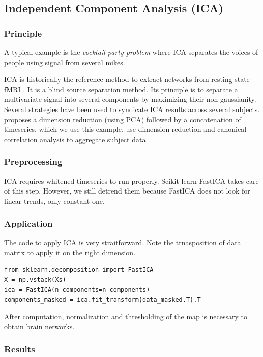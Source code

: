 \documentclass{frontiersSCNS} %
\begin{document}
\subsection{Independent Component Analysis (ICA)}

\subsubsection{Principle}

A typical example is the \emph{cocktail party problem} where ICA separates the
voices of people using signal from several mikes.

ICA is historically the reference method to extract networks from resting state
fMRI \cite{biswal1999}. It is a blind source separation method. Its principle is
to separate a
multivariate signal into several components by maximizing their non-gaussianity.
Several strategies have been used to syndicate ICA
results across several subjects. \cite{calhoun2001a} proposes a dimension
reduction (using PCA) followed by a concatenation of timeseries, which we use
this example.
\cite{varoquaux2010} use dimension reduction and canonical correlation analysis
to aggregate subject data.

\subsubsection{Preprocessing}

ICA requires whitened timeseries to run properly. Scikit-learn FastICA takes care
of this step. However, we still detrend them because
FastICA does not look for linear trends, only constant one.

\subsubsection{Application}

The code to apply ICA is very straitforward. Note the trnasposition of data
matrix to apply it on the right dimension.

\begin{lstlisting}
from sklearn.decomposition import FastICA
X = np.vstack(Xs)
ica = FastICA(n_components=n_components)
components_masked = ica.fit_transform(data_masked.T).T
\end{lstlisting}

After computation, normalization and thresholding of the map is necessary to
obtain brain networks.

\subsubsection{Results}
\end{document}

